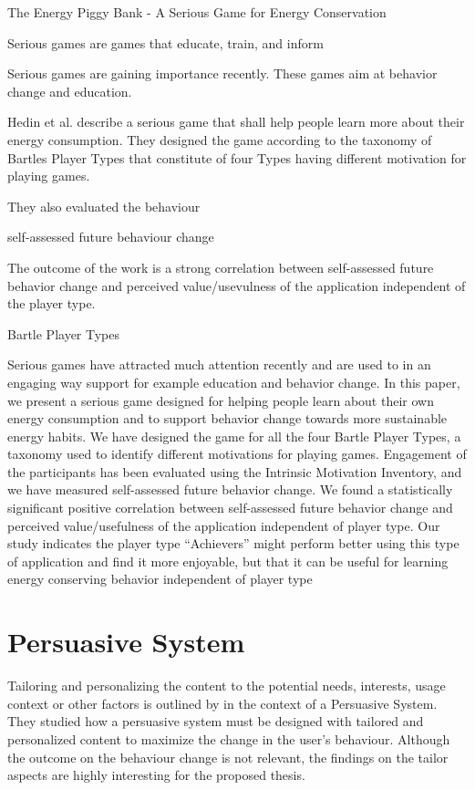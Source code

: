 The Energy Piggy Bank - A Serious Game for Energy Conservation

Serious games are games that educate, train, and inform

Serious games are gaining importance recently. These games aim at behavior change and education.

Hedin et al. \cite{Bjorn1165339} describe a serious game that shall help people learn more about their energy consumption. They designed the game according to the taxonomy of Bartles Player Types that constitute of four Types having different motivation for playing games.


They also evaluated the behaviour 

self-assessed future behaviour change 

The outcome of the work is a strong correlation between self-assessed future behavior change and perceived value/usevulness of the application independent of the player type.

Bartle Player Types

Serious games have attracted much attention recently and are used to in an engaging way support for example education and behavior change. In this paper, we present a serious game designed for helping people learn about their own energy consumption and to support behavior change towards more sustainable energy habits. We have designed the game for all the four Bartle Player Types, a taxonomy used to identify different motivations for playing games. Engagement of the participants has been evaluated using the Intrinsic Motivation Inventory, and we have measured self-assessed future behavior change. We found a statistically significant positive correlation between self-assessed future behavior change and perceived value/usefulness of the application independent of player type. Our study indicates the player type “Achievers” might perform better using this type of application and find it more enjoyable, but that it can be useful for learning energy conserving behavior independent of player type


\section{Persuasive System}
Tailoring and personalizing the content to the potential needs, interests, usage context or other factors is outlined by \cite{oinas2009persuasive} in the context of a Persuasive System. They studied how a persuasive system must be designed with tailored and personalized content to maximize the change in the user's behaviour. Although the outcome on the behaviour change is not relevant, the findings on the tailor aspects are highly interesting for the proposed thesis.




